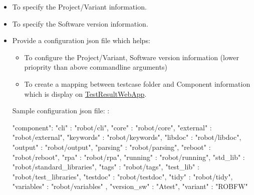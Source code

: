 \begin{itemize}
\item
{}

  To specify the {Project/Variant} information.
\item
{}

  To specify the {Software version} information.
\item
{}

  Provide a configuration json file  which helps:

  \begin{itemize}
  \tightlist
  \item
    To configure the {Project/Variant}, {Software version} information
    (lower prioprity than above commandline arguments)
  \item
    To create a mapping between testcase folder and {Component}
    information which is display on
    \href{https://github.com/test-fullautomation/testresultwebapp}{TestResultWebApp}.
  \end{itemize}

  Sample configuration json file: :

\begin{pythoncode}
{
   "component": {
      "cli"       : "robot/cli",
      "core"      : "robot/core",
      "external"  : "robot/external",
      "keywords"  : "robot/keywords",
      "libdoc"    : "robot/libdoc",
      "output"    : "robot/output",
      "parsing"   : "robot/parsing",
      "reboot"    : "robot/reboot",
      "rpa"       : "robot/rpa",
      "running"   : "robot/running",
      "std_lib"   : "robot/standard_libraries",
      "tags"      : "robot/tags",
      "test_lib"  : "robot/test_libraries",
      "testdoc"   : "robot/testdoc",
      "tidy"      : "robot/tidy",
      "variables" : "robot/variables"
   },
      "version_sw"   : "Atest",
      "variant"      : "ROBFW"
   }
\end{pythoncode}
\end{itemize}
